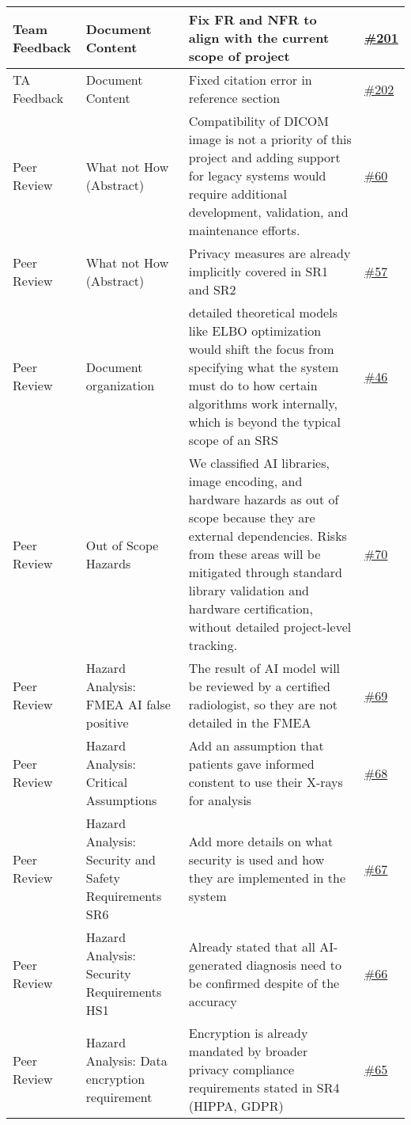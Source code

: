 \documentclass{article}
\begin{document}
\begin{longtable}{| p{} | p{} | p{} | p{} |}
    \hline
    Team Feedback & Document Content & Fix FR and NFR to align with the current scope of project & \href{https://github.com/RezaJodeiri/CXR-Capstone/issues/201}{\#201}\\
    \hline
    TA Feedback & Document Content & Fixed citation error in reference section  & \href{https://github.com/RezaJodeiri/CXR-Capstone/issues/202}{\#202}\\
    \hline
    Peer Review & What not How (Abstract) & Compatibility of DICOM image is not a priority of this project and adding support for legacy systems would require additional development, validation, and maintenance efforts. & \href{https://github.com/RezaJodeiri/CXR-Capstone/issues/60}{\#60}\\
    \hline
    Peer Review & What not How (Abstract) & Privacy measures are already implicitly covered in SR1 and SR2  & \href{https://github.com/RezaJodeiri/CXR-Capstone/issues/57}{\#57} \\
    \hline
    Peer Review & Document organization & detailed theoretical models like ELBO optimization would shift the focus from specifying what the system must do to how certain algorithms work internally, which is beyond the typical scope of an SRS  & \href{https://github.com/RezaJodeiri/CXR-Capstone/issues/46}{\#46} \\
    \hline
    Peer Review & Out of Scope Hazards & We classified AI libraries, image encoding, and hardware hazards as out of scope because they are external dependencies. Risks from these areas will be mitigated through standard library validation and hardware certification, without detailed project-level tracking. & \href{https://github.com/RezaJodeiri/CXR-Capstone/issues/70}{\#70}\\
    \hline 
    Peer Review & Hazard Analysis: FMEA AI false positive & The result of AI model will be reviewed by a certified radiologist,  so they are not detailed in the FMEA & \href{https://github.com/RezaJodeiri/CXR-Capstone/issues/69}{\#69}\\
    \hline
    Peer Review & Hazard Analysis: Critical Assumptions & Add an assumption that patients gave informed constent to use their X-rays for analysis & \href{https://github.com/RezaJodeiri/CXR-Capstone/issues/68}{\#68}\\
    \hline 
    Peer Review & Hazard Analysis: Security and Safety Requirements SR6 & Add more details on what security is used and how they are implemented in the system & \href{https://github.com/RezaJodeiri/CXR-Capstone/issues/67}{\#67}\\
    \hline
    Peer Review &  Hazard Analysis: Security Requirements HS1 & Already stated that all AI-generated diagnosis need to be confirmed despite of the accuracy & \href{https://github.com/RezaJodeiri/CXR-Capstone/issues/66}{\#66}\\
    \hline
    Peer Review & Hazard Analysis: Data encryption requirement & Encryption is already mandated by broader privacy compliance requirements stated in SR4 (HIPPA, GDPR) & \href{https://github.com/RezaJodeiri/CXR-Capstone/issues/65}{\#65}\\
    \hline
    

\end{longtable}
\end{document}

